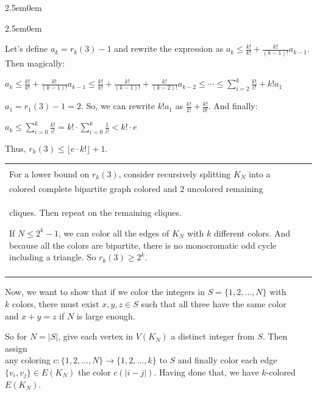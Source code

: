 \documentclass{book}
\newcommand{\teachComment}{
   \color{Orange}%
   \fontsize{12}{14}\selectfont%
}
\newenvironment{myIndent}{%
   \begin{adjustwidth}{2.5em}{0em}%
}{%
   \end{adjustwidth}%
}
\newenvironment{myClosureOne}[2][.]{%
   \color{#1}%
   \begin{tabular}{|p{#2in}|} \hline \\%
}{%
   \\ \hline \end{tabular}%
}
\newcommand{\retTwo}{\hfill\bigbreak}
\begin{document}
{\begin{myIndent}
{\begin{myIndent}
      Let's define $a_k = r_k(3) - 1$ and rewrite the expression as $a_k \leq \frac{k!}{k!} + \frac{k!}{(k-1)!}a_{k-1}$.\\ Then magically:

      {\center $ a_k \leq \frac{k!}{k!} + \frac{k!}{(k-1)!}a_{k-1} \leq \frac{k!}{k!} + \frac{k!}{(k-1)!} + \frac{k!}{(k-2)!}a_{k-2} \leq \cdots \leq \sum\limits_{i=2}^k\frac{k!}{i!} + k!a_{1}$\retTwo\par}

      $a_1 = r_1(3) - 1 = 2$. So, we can rewrite $k!a_{1}$ as $\frac{k!}{1!} + \frac{k!}{0!}$. And finally:

      {\center $ a_k \leq \sum\limits_{i=0}^k\frac{k!}{i!} = k! \cdot \sum\limits_{i=0}^k\frac{1}{i!} < k!\cdot e$\retTwo\par}

      Thus, $r_k(3) \leq \lfloor e\cdot k! \rfloor + 1$. \retTwo

      {\begin{center} \teachComment
         \begin{myClosureOne}{5}
            For a lower bound on $r_k(3)$, consider recursively splitting $K_N$ into a\\ colored complete bipartite graph colored and $2$ uncolored remaining\\ cliques. Then repeat on the remaining cliques.\retTwo

            If $N \leq 2^k - 1$, we can color all the edges of $K_N$ with $k$ different colors. And because all the colors are bipartite, there is no monocromatic odd cycle including a triangle. So $r_k(3) \geq 2^k$.\\
         \end{myClosureOne}
         \retTwo \retTwo
      \end{center}}
   \end{myIndent}}

   Now, we want to show that if we color the integers in $S = \{1, 2, \ldots, N\}$ with\\ $k$ colors, there must exist $x, y, z \in S$ such that all three have the same color\\ and $x + y = z$ if $N$ is large enough. \retTwo

   So for $N = |S|$, give each vertex in $V(K_N)$ a distinct integer from  $S$. Then assign\\ any coloring $c: \{1, 2, \ldots, N\} \rightarrow \{1, 2, \ldots, k\}$ to $S$ and finally color each edge\\ $\{v_i, v_j\} \in E(K_N)$ the color $c(|i-j|)$. Having done that, we have $k$-colored\\ $E(K_N)$.


\end{myIndent}}
\end{document}
